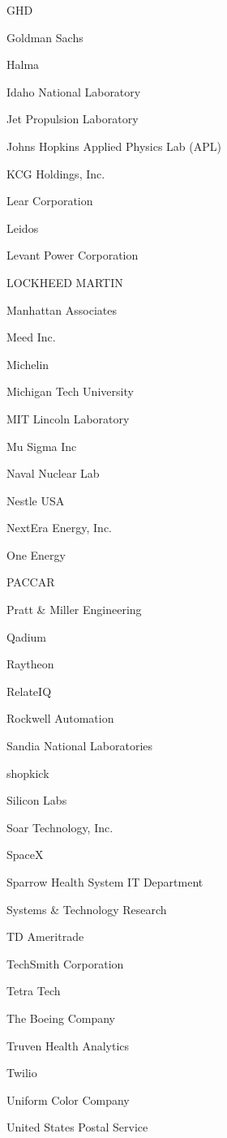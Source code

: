 \documentclass[twoside]{article}
\begin{document}
\begin{center}
\begin{multicols}{5}
\begin{FlushLeft}
\begin{compactitem}
\item GHD
\item Goldman Sachs
\item Halma
\item Idaho National Laboratory
\item Jet Propulsion Laboratory
\item Johns Hopkins Applied Physics Lab (APL)
\item KCG Holdings, Inc.
\item Lear Corporation
\item Leidos
\item Levant Power Corporation
\item LOCKHEED MARTIN
\item Manhattan Associates
\item Meed Inc.
\item Michelin
\item Michigan Tech University
\item MIT Lincoln Laboratory
\item Mu Sigma Inc
\item Naval Nuclear Lab
\item Nestle USA
\item NextEra Energy, Inc.
\item One Energy
\item PACCAR
\item Pratt \& Miller Engineering
\item Qadium
\item Raytheon
\item RelateIQ
\item Rockwell Automation
\item Sandia National Laboratories
\item shopkick
\item Silicon Labs
\item Soar Technology, Inc.
\item SpaceX
\item Sparrow Health System IT Department
\item Systems \& Technology Research
\item TD Ameritrade
\item TechSmith Corporation
\item Tetra Tech
\item The Boeing Company
\item Truven Health Analytics
\item Twilio
\item Uniform Color Company
\item United States Postal Service

\end{compactitem}
\end{FlushLeft}
\end{multicols}
\end{center}
\end{document}
